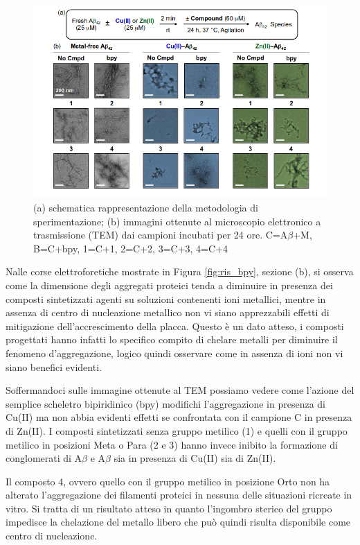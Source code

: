 \documentclass[a4paper, 12pt]{article}
\begin{document}
\begin{figure}[H]
	\centering
	\includegraphics[width=\linewidth]{immagini/ris_bpy2.png}
	\caption{(a) schematica rappresentazione della metodologia di sperimentazione; (b) immagini ottenute al microscopio elettronico a trasmissione (TEM) dai campioni incubati per 24 ore. C=A$\beta$+M, B=C+bpy, 1=C+1, 2=C+2, 3=C+3, 4=C+4 }
	\label{fig:ris_bpy2}
\end{figure}

Nalle corse elettroforetiche mostrate in Figura \ref{fig:ris_bpy}, sezione (b), si osserva come la dimensione degli aggregati proteici tenda a diminuire in presenza dei composti sintetizzati agenti su soluzioni contenenti ioni metallici, mentre in assenza di centro di nucleazione metallico non vi siano apprezzabili effetti di mitigazione dell'accrescimento della placca. Questo è un dato atteso, i composti progettati hanno infatti lo specifico compito di chelare metalli per diminuire il fenomeno d'aggregazione, logico quindi osservare come in assenza di ioni non vi siano benefici evidenti.

Soffermandoci sulle immagine ottenute al TEM possiamo vedere come l'azione del semplice scheletro bipiridinico (bpy) modifichi l'aggregazione in presenza di Cu(II) ma non abbia evidenti effetti se confrontata con il campione C in presenza di Zn(II). I composti sintetizzati senza gruppo metilico (1) e quelli con il gruppo metilico in posizioni Meta o Para (2 e 3) hanno invece inibito la formazione di conglomerati di A$\beta$ e A$\beta$ sia in presenza di Cu(II) sia di Zn(II).

Il composto 4, ovvero quello con il gruppo metilico in posizione Orto non ha alterato l’aggregazione dei filamenti proteici in nessuna delle situazioni ricreate in vitro. Si tratta di un risultato atteso in quanto l’ingombro sterico del gruppo  impedisce la chelazione del metallo libero che può quindi risulta disponibile come centro di nucleazione.
\end{document}
